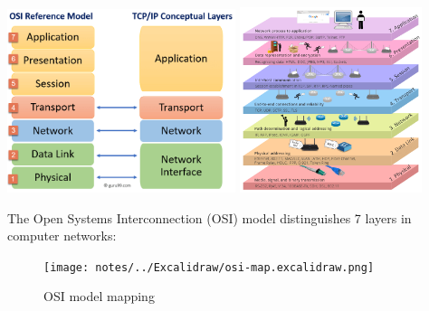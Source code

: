 \includegraphics[width=0.5\textwidth,height=0.3\textheight]{notes/../figures/osi-model-2.png}
\includegraphics[width=0.4\textwidth,height=0.3\textheight]{notes/../figures/osi-model-1.png}

The Open Systems Interconnection (OSI) model distinguishes 7 layers in
computer networks:

\begin{figure}
\centering
\texttt{[image: notes/../Excalidraw/osi-map.excalidraw.png]}
\caption{OSI model mapping}
\end{figure}

\newpage

